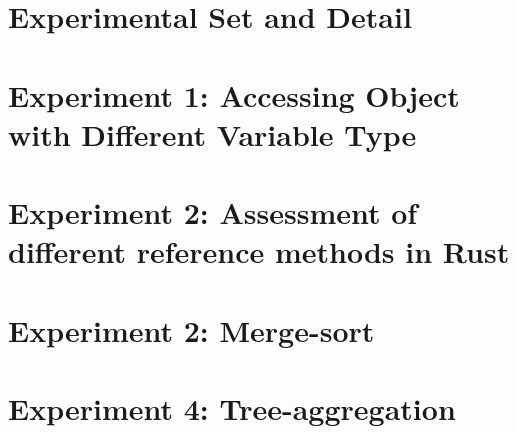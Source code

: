 
\section{Experimental Set and Detail}
\label{sec:eval_setdetail}

\clearpage

\section{Experiment 1: Accessing Object with Different Variable Type}
\label{sec:eval_diffval}

\clearpage

\section{Experiment 2: Assessment of different reference methods in Rust}
\label{sec:eval_refcount}

\clearpage

\section{Experiment 2: Merge-sort}
\label{sec:eval_sort}

\clearpage

\section{Experiment 4: Tree-aggregation}
\label{sec:eval_treeagg}

\clearpage

% 